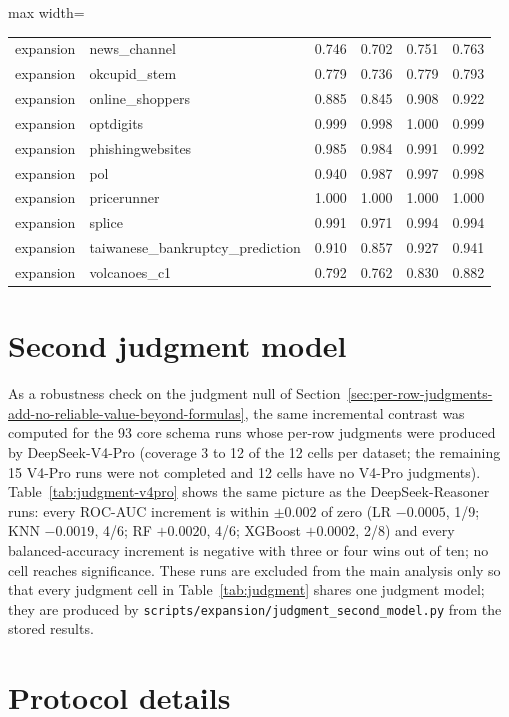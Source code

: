 \begin{table}[htbp]
\begin{adjustbox}{max width=\linewidth}
\begin{tabular}{llrrrr}
expansion & news\_channel & 0.746 & 0.702 & 0.751 & 0.763 \\
expansion & okcupid\_stem & 0.779 & 0.736 & 0.779 & 0.793 \\
expansion & online\_shoppers & 0.885 & 0.845 & 0.908 & 0.922 \\
expansion & optdigits & 0.999 & 0.998 & 1.000 & 0.999 \\
expansion & phishingwebsites & 0.985 & 0.984 & 0.991 & 0.992 \\
expansion & pol & 0.940 & 0.987 & 0.997 & 0.998 \\
expansion & pricerunner & 1.000 & 1.000 & 1.000 & 1.000 \\
expansion & splice & 0.991 & 0.971 & 0.994 & 0.994 \\
expansion & taiwanese\_bankruptcy\_prediction & 0.910 & 0.857 & 0.927 & 0.941 \\
expansion & volcanoes\_c1 & 0.792 & 0.762 & 0.830 & 0.882 \\
\bottomrule
\end{tabular}
\end{adjustbox}
\end{table}

\section{Second judgment model}\label{app:judgment-v4pro}

As a robustness check on the judgment null of Section~\ref{sec:per-row-judgments-add-no-reliable-value-beyond-formulas}, the same incremental contrast was computed for the 93 core schema runs whose per-row judgments were produced by DeepSeek-V4-Pro (coverage 3 to 12 of the 12 cells per dataset; the remaining 15 V4-Pro runs were not completed and 12 cells have no V4-Pro judgments). Table~\ref{tab:judgment-v4pro} shows the same picture as the DeepSeek-Reasoner runs: every ROC-AUC increment is within \(\pm 0.002\) of zero (LR \(-0.0005\), 1/9; KNN \(-0.0019\), 4/6; RF \(+0.0020\), 4/6; XGBoost \(+0.0002\), 2/8) and every balanced-accuracy increment is negative with three or four wins out of ten; no cell reaches significance. These runs are excluded from the main analysis only so that every judgment cell in Table~\ref{tab:judgment} shares one judgment model; they are produced by \texttt{scripts/expansion/judgment\_second\_model.py} from the stored results.



\section{Protocol details}\label{app:protocol-details}

